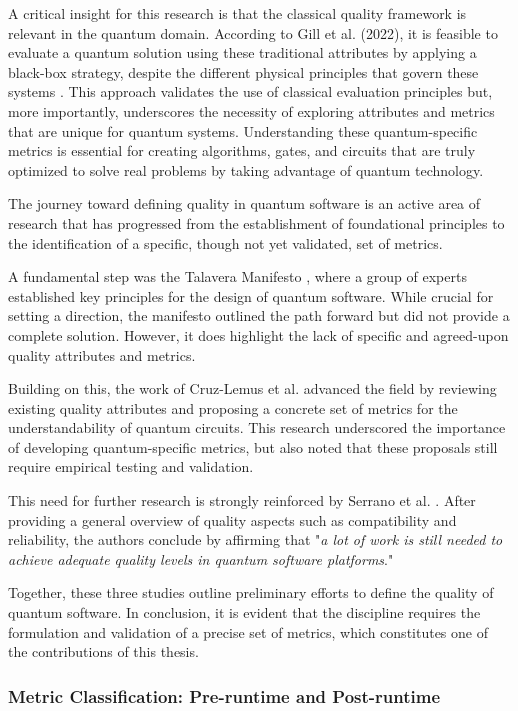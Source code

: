 \documentclass{article}
\begin{document}
A critical insight for this research is that the classical quality framework is relevant in the quantum domain. According to Gill et al. (2022), it is feasible to evaluate a quantum solution using these traditional attributes by applying a black-box strategy, despite the different physical principles that govern these systems \cite{Gill2022}. This approach validates the use of classical evaluation principles but, more importantly, underscores the necessity of exploring attributes and metrics that are unique for quantum systems. Understanding these quantum-specific metrics is essential for creating algorithms, gates, and circuits that are truly optimized to solve real problems by taking advantage of quantum technology.

The journey toward defining quality in quantum software is an active area of research that has progressed from the establishment of foundational principles to the identification of a specific, though not yet validated, set of metrics.

A fundamental step was the Talavera Manifesto \cite{Piattini2020}, where a group of experts established key principles for the design of quantum software. While crucial for setting a direction, the manifesto outlined the path forward but did not provide a complete solution. However, it does highlight the lack of specific and agreed-upon quality attributes and metrics.

Building on this, the work of Cruz-Lemus et al. \cite{JoseCruz2021Towards} advanced the field by reviewing existing quality attributes and proposing a concrete set of metrics for the understandability of quantum circuits. This research underscored the importance of developing quantum-specific metrics, but also noted that these proposals still require empirical testing and validation.

This need for further research is strongly reinforced by Serrano et al. \cite{Serrano2022}. After providing a general overview of quality aspects such as compatibility and reliability, the authors conclude by affirming that "\textit{a lot of work is still needed to achieve adequate quality levels in quantum software platforms}."

Together, these three studies outline preliminary efforts to define the quality of quantum software. In conclusion, it is evident that the discipline requires the formulation and validation of a precise set of metrics, which constitutes one of the contributions of this thesis.

\subsubsection{Metric Classification: Pre-runtime and Post-runtime}
\label{subsec:metric-classification}
\end{document}
